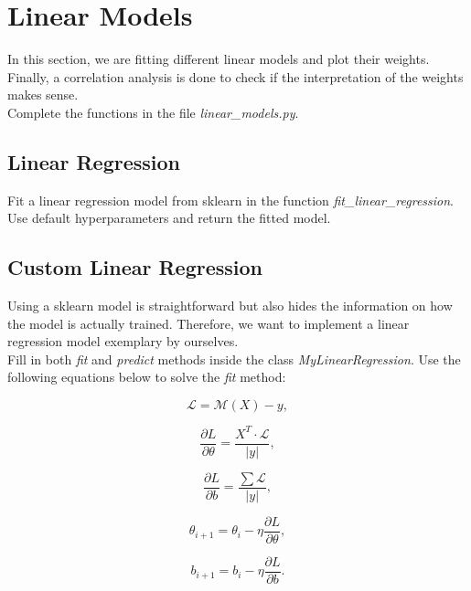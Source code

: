 \documentclass[a4paper]{article}
\begin{document}
\section{Linear Models}

\noindent In this section, we are fitting different linear models and plot their weights. Finally, a correlation analysis is done to check if the interpretation of the weights makes sense.\\

\noindent Complete the functions in the file \textit{linear\_models.py}.

\subsection{Linear Regression}
Fit a linear regression model from sklearn in the function \textit{fit\_linear\_regression}. Use default hyperparameters and return the fitted model.


\subsection{Custom Linear Regression}
Using a sklearn model is straightforward but also hides the information on how the model is actually trained. Therefore, we want to implement a linear regression model exemplary by ourselves.\\

\noindent Fill in both \textit{fit} and \textit{predict} methods inside the class \textit{MyLinearRegression}. Use the following equations below to solve the \textit{fit} method:

\begin{equation}
    \mathcal{L} = \mathcal{M}(X) - y,
\end{equation}

\begin{equation}
    \dfrac{\partial L}{\partial \theta} = \dfrac{X^T \cdot \mathcal{L}}{|y|},
\end{equation}

\begin{equation}
    \dfrac{\partial L}{\partial b}  = \dfrac{\sum{\mathcal{L}}}{|y|},
\end{equation}

\begin{equation}
    \theta_{i+1} = \theta_{i} - \eta \dfrac{\partial L}{\partial \theta},
\end{equation}

\begin{equation}
    b_{i+1} = b_{i} - \eta \dfrac{\partial L}{\partial b}.
\end{equation}
\end{document}
